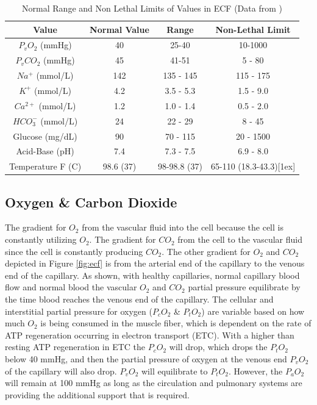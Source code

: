 \begin{table}[h!]
\centering
\begin{tabular}{||c c c c||} 
 \hline
Value & Normal Value & Range & Non-Lethal Limit\\ [0.5ex] 
 \hline\hline
 $P_v O_2$ (mmHg) & 40  & 25-40 & 10-1000 \\
 $P_v CO_2$ (mmHg) & 45 & 41-51 & 5 - 80\\ 
 $Na^+$ (mmol/L) & 142 & 135 - 145 & 115 - 175\\
 $K^+$  (mmol/L) & 4.2 & 3.5 - 5.3 & 1.5 - 9.0\\ 
 $Ca^{2+}$ (mmol/L) & 1.2 & 1.0 - 1.4 & 0.5 - 2.0 \\
 $HCO_3 ^-$ (mmol/L)& 24 & 22 - 29 & 8 - 45 \\
 Glucose (mg/dL)& 90 & 70 - 115 & 20 - 1500 \\
 Acid-Base (pH) & 7.4 & 7.3 - 7.5 & 6.9 - 8.0 \\
 Temperature F (C) & 98.6 (37) & 98-98.8 (37) & 65-110 (18.3-43.3)[1ex] 
 \hline
\end{tabular}
\caption{Normal Range and Non Lethal Limits of Values in ECF (\footnotesize{Data from \cite{feher_quantitative_2017}})}
\label{table:ecf_value_ranges}
\end{table}

\subsection{Oxygen \& Carbon Dioxide}

The gradient for $O_2$ from the vascular fluid into the cell because the cell is constantly utilizing $O_2$. The gradient for $CO_2$ from the cell to the vascular fluid since the cell is constantly producing $CO_2$. The other gradient for $O_2$ and $CO_2$ depicted in Figure \ref{fig:ecf} is from the arterial end of the capillary to the venous end of the capillary. As shown, with healthy capillaries, normal capillary blood flow and normal blood the vascular $O_2$ and $CO_2$ partial pressure equilibrate by the time blood reaches the venous end of the capillary. The cellular and interstitial partial pressure for oxygen ($P_c O_2$ \& $P_t O_2$) are variable based on how much $O_2$ is being consumed in the muscle fiber, which is dependent on the rate of ATP regeneration occurring in electron transport (ETC). With a higher than resting ATP regeneration in ETC the $P_c O_2$ will drop, which drops the $P_t O_2$ below 40 mmHg, and then the partial pressure of oxygen at the venous end $P_v O_2$ of the capillary will also drop. $P_v O_2$ will equilibrate to $P_t O_2$. However, the $P_a O_2$ will remain at 100 mmHg as long as the circulation and pulmonary systems are providing the additional support that is required.

